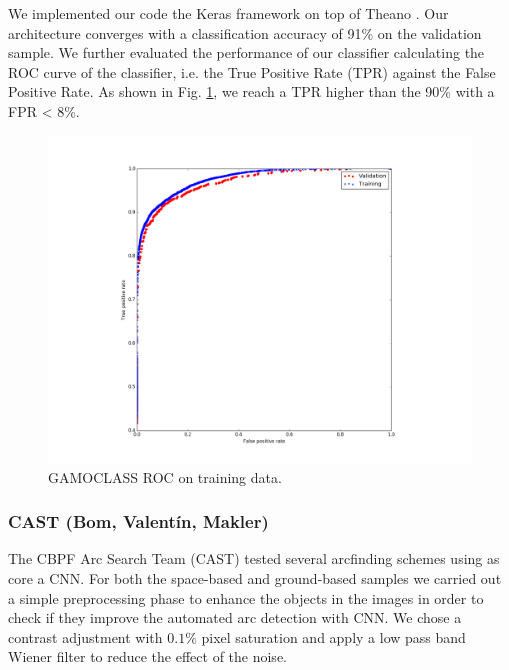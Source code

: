 \documentclass[useAMS,usenatbib]{mnras}
\begin{document}
We implemented our code the Keras framework \citep{Chollet_2015} on top of Theano \citep{Bastien_2012}.
Our architecture converges with a classification accuracy of 91\% on the validation sample. We further evaluated the performance of our classifier calculating the ROC curve of the classifier, i.e. the True Positive Rate (TPR) against the False Positive Rate. As shown in Fig. \ref{Fig2_gamoclass}, we reach a TPR higher than the 90\% with a FPR < 8\%.

\begin{figure}
  \centering
      \includegraphics[width=1\columnwidth]{figures/Fig2_gamoclass.pdf} 
  \caption{GAMOCLASS ROC on training data.}
 \label{Fig2_gamoclass}
\end{figure}


\subsubsection{CAST (Bom, Valent\'in, Makler)}

The CBPF Arc Search Team (CAST) tested several arcfinding schemes using as core a CNN. For both the space-based and ground-based samples we carried out a simple preprocessing phase to enhance the objects in the images in order to check if they improve the automated arc detection with CNN. We chose a contrast adjustment with $0.1\%$ pixel saturation and apply a low pass band Wiener filter \citep{wiener1964extrapolation} to reduce the effect of the noise. 
\end{document}
